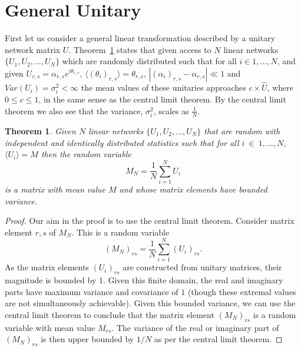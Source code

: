 \documentclass[aps,pra,twocolumn,superscriptaddress,numerical]{revtex4-1}
\newtheorem{theorem}{Theorem}
\begin{document}
\section{General Unitary\label{gen case}}
First let us consider a general linear transformation described by a unitary network matrix $U$. Theorem~\ref{Theorem 1} states that given access to $N$ linear networks $\{U_1,U_2,\ldots,U_N\}$ which are randomly distributed such that for all $i \in {1,\ldots,N}$, and given $U_{r,s}=\alpha_{r,s}e^{i\theta_{r,s}}$, $\langle \left(\theta_{i}\right)_{r,s} \rangle = \theta_{r,s}$, $\left|\left(\alpha_{i}\right)_{r,s}-\alpha_{r,s}\right|\ll1$ and $Var(U_i) = \sigma_i^2 < \infty$  the mean values of these unitaries approaches $c\times\hat{U}$, where $0\le c\le1$, in the same sense as the central limit theorem. By the central limit theorem we also see that the variance, $\sigma_{i}^{2}$, scales as $\frac{1}{N}$.

\begin{theorem}
\label{Theorem 1}
Given $N$ linear networks $\{U_1,U_2,\ldots,U_N\}$ that are random with independent and identically distributed statistics such that for all $i~\in~{1,\ldots,N}$, $\langle U_i \rangle = M$ then the random variable 
\begin{equation}
	\label{sum_unitary}
	M_{N}=\frac{1}{N}\sum_{i=1}^{N}U_{i}
\end{equation}
is a matrix with mean value $M$ and whose matrix elements have bounded variance.
\end{theorem}

\begin{proof}\label{Proof 1}
Our aim in the proof is to use the central limit theorem.  Consider matrix element $r,s$ of $M_N$.  This is a random variable
\begin{equation}
	\left(M_N\right)_{rs} = \frac{1}{N} \sum_{i=1}^N \left(U_i\right)_{rs}.
\end{equation}
As the matrix elements $(U_i)_{rs}$ are constructed from unitary matrices, their magnitude is bounded by $1$.  Given this finite domain, the real and imaginary parts have maximum variance and covariance of $1$ (though these extremal values are not simultaneously achievable).  Given this bounded variance, we can use the central limit theorem to conclude that the matrix element $\left(M_N\right)_{rs}$ is a random variable with mean value $M_{rs}$.
The variance of the real or imaginary part of $(M_N)_{rs}$ is then upper bounded by $1/N$ as per the central limit theorem.
\end{proof}
\end{document}
